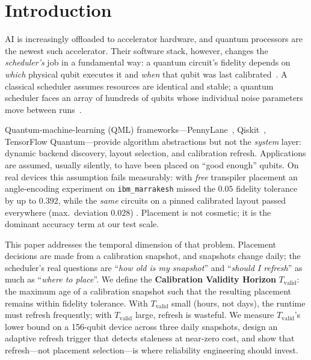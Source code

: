 \documentclass[journal,10pt,twocolumn]{IEEEtran}
\begin{document}
\section{Introduction}
 AI is increasingly offloaded to accelerator hardware, and quantum processors are the
newest such accelerator. Their software stack, however, changes the \emph{scheduler's} job in a fundamental way: a
quantum circuit's fidelity depends on \emph{which} physical qubit executes it and \emph{when} that qubit was last
calibrated~\cite{preskill2018,arute2019,murali2019noise,li2019sabre}. A classical scheduler assumes resources are
identical and stable; a quantum scheduler faces an array of hundreds of qubits whose individual noise parameters
move between runs~\cite{ibmcalib,kanazawa2021,vanberg2023}.

Quantum-machine-learning (QML) frameworks---PennyLane~\cite{berholm2018}, Qiskit~\cite{qiskit}, TensorFlow
Quantum---provide algorithm abstractions but not the \emph{system} layer: dynamic backend discovery, layout
selection, and calibration refresh. Applications are assumed, usually silently, to have been placed on ``good
enough'' qubits. On real devices this assumption fails measurably: with \emph{free} transpiler placement an
angle-encoding experiment on \texttt{ibm\_marrakesh} missed the $0.05$ fidelity tolerance by up to $0.392$,
while the \emph{same} circuits on a pinned calibrated layout passed everywhere (max.\ deviation $0.028$)
\cite{tangpu}. Placement is not cosmetic; it is the dominant accuracy term at our test scale.

This paper addresses the temporal dimension of that problem. Placement decisions are made from a calibration
snapshot, and snapshots change daily; the scheduler's real questions are ``\emph{how old is my snapshot}'' and
``\emph{should I refresh}'' as much as ``\emph{where to place}''. We define the \textbf{Calibration Validity
Horizon} $T_{\mathrm{valid}}$: the maximum age of a calibration snapshot such that the resulting placement
remains within fidelity tolerance. With $T_{\mathrm{valid}}$ small (hours, not days), the runtime must refresh
frequently; with $T_{\mathrm{valid}}$ large, refresh is wasteful. We measure $T_{\mathrm{valid}}$'s lower bound
on a 156-qubit device across three daily snapshots, design an adaptive refresh trigger that detects staleness at
near-zero cost, and show that refresh---not placement selection---is where reliability engineering should invest.
\end{document}
